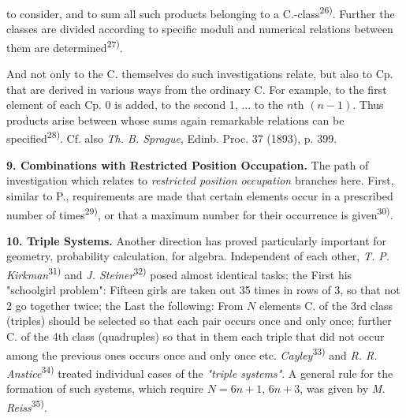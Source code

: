\thispagestyle{fancy}

\vspace{0.5cm}

to consider, and to sum all such products belonging to a C.-class\textsuperscript{26)}. Further the classes are divided according to specific moduli and numerical relations between them are determined\textsuperscript{27)}.

And not only to the C. themselves do such investigations relate, but also to Cp. that are derived in various ways from the ordinary C. For example, to the first element of each Cp. 0 is added, to the second 1, ... to the $n$th $(n-1)$. Thus products arise between whose sums again remarkable relations can be specified\textsuperscript{28)}. Cf. also \textit{Th. B. Sprague}, Edinb. Proc. 37 (1893), p. 399.

\vspace{0.1cm}

\textbf{9. Combinations with Restricted Position Occupation.} The path of investigation which relates to \textit{restricted position occupation} branches here. First, similar to P., requirements are made that certain elements occur in a prescribed number of times\textsuperscript{29)}, or that a maximum number for their occurrence is given\textsuperscript{30)}.

\vspace{0.1cm}

\textbf{10. Triple Systems.} Another direction has proved particularly important for geometry, probability calculation, for algebra. Independent of each other, \textit{T. P. Kirkman}\textsuperscript{31)} and \textit{J. Steiner}\textsuperscript{32)} posed almost identical tasks; the First his "schoolgirl problem": Fifteen girls are taken out 35 times in rows of 3, so that not 2 go together twice; the Last the following: From $N$ elements C. of the 3rd class (triples) should be selected so that each pair occurs once and only once; further C. of the 4th class (quadruples) so that in them each triple that did not occur among the previous ones occurs once and only once etc. \textit{Cayley}\textsuperscript{33)} and \textit{R. R. Anstice}\textsuperscript{34)} treated individual cases of the \textit{"triple systems"}. A general rule for the formation of such systems, which require $N=6n+1$, $6n+3$, was given by \textit{M. Reiss}\textsuperscript{35)}.

